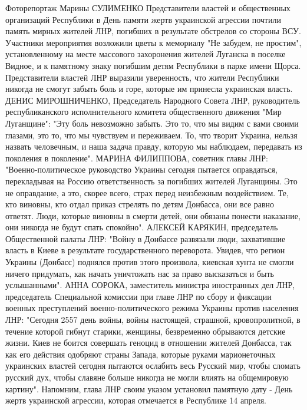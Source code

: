 Фоторепортаж Марины СУЛИМЕНКО
Представители властей и общественных организаций Республики в День памяти жертв украинской агрессии почтили память мирных жителей ЛНР, погибших в результате обстрелов со стороны ВСУ. Участники мероприятия возложили цветы к мемориалу "Не забудем, не простим", установленному на месте массового захоронения жителей Луганска в поселке Видное, и к памятному знаку погибшим детям Республики в парке имени Щорса.
Представители властей ЛНР выразили уверенность, что  жители Республики никогда не смогут забыть боль и горе, которые им принесла украинская власть.
ДЕНИС МИРОШНИЧЕНКО, Председатель Народного Совета ЛНР, руководитель республиканского исполнительного комитета общественного движения "Мир Луганщине": "Эту боль невозможно забыть. Это то, что мы видим с вами своими глазами, это то, что мы чувствуем и переживаем. То, что творит Украина, нельзя назвать человечным, и наша задача правду, которую мы наблюдаем, передавать из поколения в поколение".
МАРИНА ФИЛИППОВА, советник главы ЛНР: "Военно-политическое руководство Украины сегодня пытается оправдаться, перекладывая на Россию ответственность за погибших жителей Луганщины. Это не оправдание, а это, скорее всего, страх перед неизбежным воздействием. Те, кто виновны, кто отдал приказ стрелять по детям Донбасса, они все равно ответят. Люди, которые виновны в смерти детей, они обязаны понести наказание, они никогда не будут спать спокойно".
АЛЕКСЕЙ КАРЯКИН, председатель Общественной палаты ЛНР: "Войну в Донбассе развязали люди, захватившие власть в Киеве в результате государственного переворота. Увидев, что регион Украины (Донбасс) поднялся против этого произвола, киевская хунта не смогли ничего придумать, как начать уничтожать нас за право высказаться и быть услышанными".
АННА СОРОКА, заместитель министра иностранных дел ЛНР, председатель Специальной комиссии при главе ЛНР по сбору и фиксации военных преступлений военно-политического режима Украины против населения ЛНР: "Сегодня 2557 день войны, войны настоящей, страшной, кровопролитной, в течение которой гибнут старики, женщины, безвременно обрываются детские жизни. Киев не боится совершать геноцид в отношении жителей Донбасса, так как его действия одобряют страны Запада, которые руками марионеточных украинских властей сегодня пытаются ослабить весь Русский мир, чтобы сломать русский дух, чтобы славяне больше никогда не могли влиять на общемировую картину".
Напомним, глава ЛНР своим указом установил памятную дату - День жертв украинской агрессии, которая отмечается в Республике 14 апреля.
